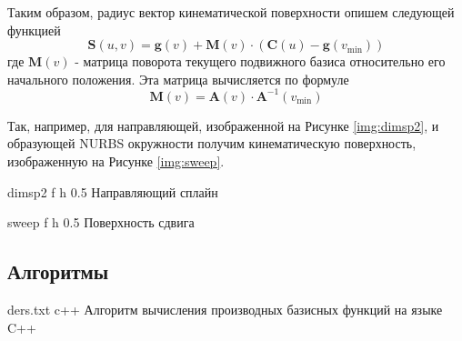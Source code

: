 \documentclass{bmstu}
\begin{document}
Таким образом, радиус вектор кинематической поверхности опишем следующей функцией
\begin{equation}
    \mathbf{S}(u,v) = \mathbf{g}(v) + \mathbf{M}(v)\cdot(\mathbf{C}(u)-\mathbf{g}(v_{\min}))
\end{equation}
где $\mathbf{M}(v)$ - матрица поворота текущего подвижного базиса относительно его начального положения. Эта матрица вычисляется по формуле
\begin{equation}
    \mathbf{M}(v) = \mathbf{A}(v)\cdot\mathbf{A}^{-1}(v_{\min})
\end{equation}

Так, например, для направляющей, изображенной на Рисунке \ref{img:dimsp2}, и образующей NURBS окружности получим кинематическую поверхность, изображенную на Рисунке \ref{img:sweep}.

{dimsp2} %
{f} %
{h} %
{0.5\textwidth} %
{Направляющий сплайн} %

{sweep} %
{f} %
{h} %
{0.5\textwidth} %
{Поверхность сдвига} %

\begin{appendices}
	\chapter{Алгоритмы}
{ders.txt} %
{c++} %
{Алгоритм вычисления производных базисных функций на языке C++} %

\end{appendices}
\end{document}
